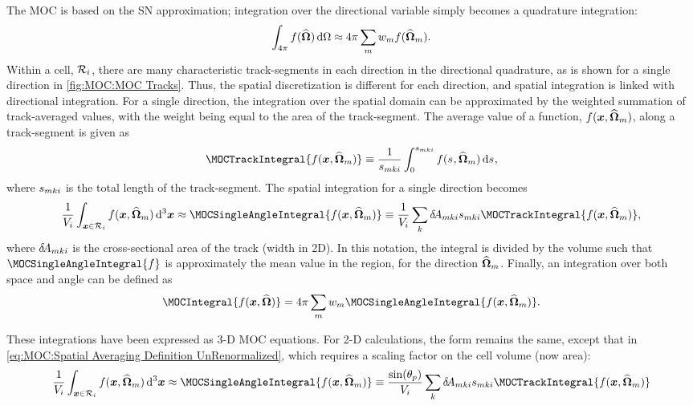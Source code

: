 {{{            The \ac{MOC} is based on the \acf{SN} approximation; integration over the directional variable simply becomes a quadrature integration:
            \begin{equation}\label{eq:MOC:Directional Quadrature Integration}
                \intl[\fourpi]f(\dir)\ddir \approx \fourpi\suml[m]\wt[m]f(\dirm).
            \end{equation}
            Within a cell, $\Region$, there are many characteristic track-segments in each direction in the directional quadrature, as is shown for a single direction in \cref{fig:MOC:MOC Tracks}.
            Thus, the spatial discretization is different for each direction, and spatial integration is linked with directional integration.
            For a single direction, the integration over the spatial domain can be approximated by the weighted summation of track-averaged values, with the weight being equal to the area of the track-segment.
            The average value of a function, $f(\loc,\dirm)$, along a track-segment is given as
            \begin{equation}\label{eq:MOC:Track-Averaged Definition UnRenormalized}
                \MOCTrackIntegral{f(\loc,\dirm)} \defined \frac{1}{\segl}\intl[0][\segl]f(\len,\dirm)\dif{\len},
            \end{equation}
            where $\segl$ is the total length of the track-segment.
            The spatial integration for a single direction becomes
            \begin{equation}\label{eq:MOC:Spatial Averaging Definition UnRenormalized}
                \frac{1}{V_i}\intl[\loc\in\Region]f(\loc,\dirm)\dif^3{\loc} \approx \MOCSingleAngleIntegral{f(\loc,\dirm)} \defined \frac{1}{V_i}\suml[k]\tA[mki]\segl\MOCTrackIntegral{f(\loc,\dirm)} ,
            \end{equation}
            where $\tA[mki]$ is the cross-sectional area of the track (width in 2D).
            In this notation, the integral is divided by the volume such that $\MOCSingleAngleIntegral{f}$ is approximately the mean value in the region, for the direction $\dirm$.
            Finally, an integration over both space and angle can be defined as
            \begin{equation}\label{eq:MOC:Spatial and Directional Integration Definition}
                \MOCIntegral{f(\loc,\dir)} = \fourpi\suml[m]\wt[m]\MOCSingleAngleIntegral{f(\loc,\dirm)}.
            \end{equation}

            These integrations have been expressed as 3-D \ac{MOC} equations.
            For 2-D calculations, the form remains the same, except that in \cref{eq:MOC:Spatial Averaging Definition UnRenormalized}, which requires a scaling factor on the cell volume (now area):
            \begin{equation}
              \label{eq:MOC:Spatial Averaging Definition UnRenormalized 2D}
              \frac{1}{V_i}\intl[\loc\in\Region]f(\loc,\dirm)\dif^3{\loc} \approx \MOCSingleAngleIntegral{f(\loc,\dirm)} \defined \frac{\sin(\Polar_p)}{V_i}\suml[k]\tA[mki]\segl\MOCTrackIntegral{f(\loc,\dirm)}
            \end{equation}
        }
}}
